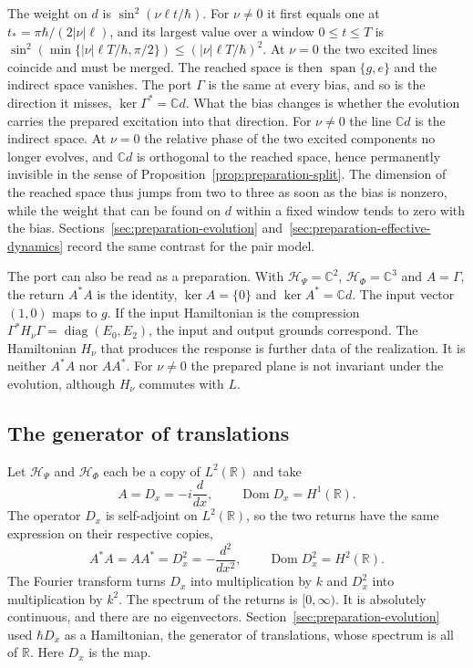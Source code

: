 \documentclass[11pt]{article}
\theoremstyle{definition}
\DeclareMathOperator{\Span}{span}
\newcommand{\C}{\mathbb C}
\newcommand{\R}{\mathbb R}
\begin{document}
The weight on $d$ is $\sin^2(\nu\ell t/\hbar)$. For $\nu\ne0$ it first equals one at $t_*=\pi\hbar/(2|\nu|\ell)$, and its largest value over a window $0\le t\le T$ is $\sin^2(\min\{|\nu|\ell T/\hbar,\pi/2\})\le(|\nu|\ell T/\hbar)^2$. At $\nu=0$ the two excited lines coincide and must be merged. The reached space is then $\Span\{g,e\}$ and the indirect space vanishes. The port $\Gamma$ is the same at every bias, and so is the direction it misses, $\ker\Gamma^*=\C d$. What the bias changes is whether the evolution carries the prepared excitation into that direction. For $\nu\ne0$ the line $\C d$ is the indirect space. At $\nu=0$ the relative phase of the two excited components no longer evolves, and $\C d$ is orthogonal to the reached space, hence permanently invisible in the sense of Proposition~\ref{prop:preparation-split}. The dimension of the reached space thus jumps from two to three as soon as the bias is nonzero, while the weight that can be found on $d$ within a fixed window tends to zero with the bias. Sections~\ref{sec:preparation-evolution} and~\ref{sec:preparation-effective-dynamics} record the same contrast for the pair model.

The port can also be read as a preparation. With $\mathcal H_\Psi=\C^2$, $\mathcal H_\Phi=\C^3$ and $A=\Gamma$, the return $A^*A$ is the identity, $\ker A=\{0\}$ and $\ker A^*=\C d$. The input vector $(1,0)$ maps to $g$. If the input Hamiltonian is the compression $\Gamma^*H_\nu\Gamma=\operatorname{diag}(E_0,E_2)$, the input and output grounds correspond. The Hamiltonian $H_\nu$ that produces the response is further data of the realization. It is neither $A^*A$ nor $AA^*$. For $\nu\ne0$ the prepared plane is not invariant under the evolution, although $H_\nu$ commutes with $L$.

\subsection{The generator of translations}
\label{subsec:four-maps-translation}

Let $\mathcal H_\Psi$ and $\mathcal H_\Phi$ each be a copy of $L^2(\R)$ and take
\begin{equation}
 A=D_x=-i\frac{d}{dx},\qquad \operatorname{Dom}D_x=H^1(\R).
 \label{eq:four-maps-translation}
\end{equation}
The operator $D_x$ is self-adjoint on $L^2(\R)$, so the two returns have the same expression on their respective copies,
\begin{equation}
 A^*A=AA^*=D_x^2=-\frac{d^2}{dx^2},\qquad \operatorname{Dom}D_x^2=H^2(\R).
 \label{eq:four-maps-translation-returns}
\end{equation}
The Fourier transform turns $D_x$ into multiplication by $k$ and $D_x^2$ into multiplication by $k^2$. The spectrum of the returns is $[0,\infty)$. It is absolutely continuous, and there are no eigenvectors. Section~\ref{sec:preparation-evolution} used $\hbar D_x$ as a Hamiltonian, the generator of translations, whose spectrum is all of $\R$. Here $D_x$ is the map.
\end{document}
